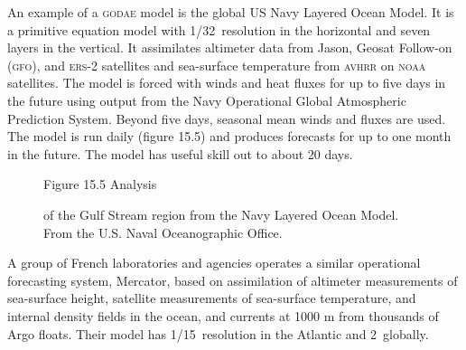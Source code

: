 An example of a \textsc{godae} model is the global US Navy Layered
Ocean Model. It is a
primitive equation model with 1/32\degrees\ resolution in the
horizontal and seven layers in the vertical. It assimilates altimeter
data from Jason, Geosat Follow-on (\textsc{gfo}), and \textsc{ers}-2
satellites and sea-surface temperature from
\textsc{avhrr} on \textsc{noaa} satellites. The
model is forced with winds and heat fluxes for up to five days in the
future using output from the Navy Operational Global Atmospheric
Prediction System. Beyond five days, seasonal mean winds and fluxes
are used. The model is run daily (figure 15.5) and produces forecasts
for up to one month in the future. The model has useful skill out to
about 20 days.

\begin{figure}[h!]
\centering
\vspace{-1ex}
\footnotesize
Figure 15.5 Analysis \rule{0mm}{4ex}of the Gulf Stream region from the Navy Layered Ocean
Model.\\From the U.S. Naval Oceanographic Office.

\label{fig:nlom-gulfstream}
\vspace{-3ex}
\end{figure}

A group of French laboratories and agencies operates a similar
operational forecasting system, Mercator, based on assimilation of altimeter
measurements of sea-surface height, satellite measurements of
sea-surface temperature, and internal density fields in the ocean, and
currents at 1000 m from thousands of Argo
floats. Their model has 1/15\degrees\ resolution in
the Atlantic and 2\degrees\ globally.

